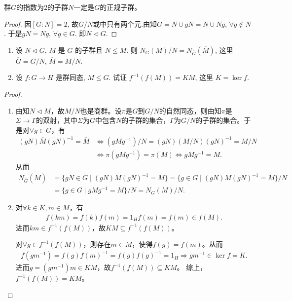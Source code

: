 \documentclass[../../main.tex]{subfiles}%
\begin{document}
\begin{proposition}\label{proposition:指数为2的子群必是正规子群}
群$G$的指数为$2$的子群$N$一定是$G$的正规子群。
\end{proposition}
\begin{proof}

因$[G:N]=2$, 故$G/N$或中只有两个元.由知$G=N\cup gN=N\cup Ng$, $\forall g\notin N$. 于是$gN=Ng$, $\forall g\in G$. 即$N\lhd G$.

\end{proof}

\begin{example}
\begin{enumerate}[(1)]
\item 设 $N \lhd G$, $M$ 是 $G$ 的子群且 $N \leqslant M$. 则 $N_G(M)/N = N_{\overline{G}}(\overline{M})$, 这里 $\overline{G}=G/N$, $\overline{M}=M/N$.
\item 设 $f: G \longrightarrow H$ 是群同态, $M \leqslant G$. 试证 $f^{-1}(f(M))=KM$, 这里 $K=\operatorname{ker} f$.
\end{enumerate}
\end{example}
\begin{proof}
\begin{enumerate}[(1)]
\item 由知$N\lhd M$，故$M/N$也是商群。设$\pi$是$G$到$G/N$的自然同态，则由知$\pi$是$\Sigma \rightarrow \Gamma$的双射，其中$\Sigma$为$G$中包含$N$的子群的集合，$\Gamma$为$G/N$的子群的集合。于是对$\forall g\in G$，有\begin{align*}
(gN)\overline{M}(gN)^{-1}=\overline{M}&\Longleftrightarrow (gMg^{-1})/N=(gN)(M/N)(gN)^{-1}=M/N\\
&\Longleftrightarrow \pi(gMg^{-1})=\pi(M)\Longleftrightarrow gMg^{-1}=M.
\end{align*}
从而\begin{align*}
N_{\overline{G}}(\overline{M})&=\{gN\in\overline{G}\mid (gN)\overline{M}(gN)^{-1}=\overline{M}\}=\{g\in G\mid (gN)\overline{M}(gN)^{-1}=\overline{M}\}/N\\
&=\{g\in G\mid gMg^{-1}=M\}/N=N_G(M)/N.
\end{align*}
\item 对$\forall k\in K,m\in M$，有\begin{align*}
f(km)=f(k)f(m)=1_Hf(m)=f(m)\in f(M).
\end{align*}
进而$km\in f^{-1}(f(M))$，故$KM\subseteq f^{-1}(f(M))$。

对$\forall g\in f^{-1}(f(M))$，则存在$m\in M$，使得$f(g)=f(m)$。从而\begin{align*}
f(gm^{-1})=f(g)f(m)^{-1}=f(g)f(g)^{-1}=1_H\Longrightarrow gm^{-1}\in\operatorname{ker}f=K.
\end{align*}
进而$g=(gm^{-1})m\in KM$，故$f^{-1}(f(M))\subseteq KM$。
综上，$f^{-1}(f(M))=KM$。
\end{enumerate}

\end{proof}
\end{document}

